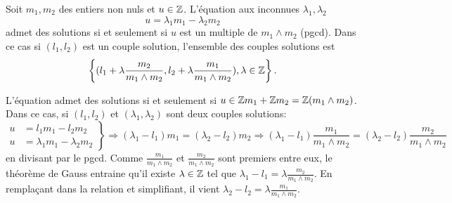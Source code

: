 \begin{propn}
  Soit $m_1, m_2$ des entiers non nuls et $u\in \mathbb{Z}$. L'équation aux inconnues $\lambda_1, \lambda_2$
  \begin{displaymath}
    u = \lambda_1 m_1 - \lambda_2 m_2
  \end{displaymath}
  admet des solutions si et seulement si $u$ est un multiple de $m_1 \wedge m_2$ (pgcd). Dans ce cas si $(l_1, l_2)$ est un couple solution, l'ensemble des couples solutions est
  \begin{displaymath}
    \left \lbrace (l_1 + \lambda \frac{m_2}{m_1 \wedge m_2},l_2 + \lambda \frac{m_1}{m_1 \wedge m_2}), \lambda \in \mathbb{Z} \right\rbrace .
  \end{displaymath}
\end{propn}
\begin{demo}
  L'équation admet des solutions si et seulement si $u \in \mathbb{Z} m_1 + \mathbb{Z} m_2 = \mathbb{Z} (m_1\wedge m_2)$. Dans ce cas, si $(l_1,l_2)$ et $(\lambda_1, \lambda_2)$ sont deux couples solutions:
  \begin{displaymath}
    \left.
    \begin{aligned}
      u &= l_1 m_1 - l_2 m_2 \\
      u &= \lambda_1 m_1 - \lambda_2 m_2
    \end{aligned}
    \right\rbrace \Rightarrow (\lambda_1 - l_1)m_1 = (\lambda_2 - l_2)m_2 \Rightarrow (\lambda_1 - l_1)\frac{m_1}{m_1 \wedge m_2} = (\lambda_2 - l_2)\frac{m_2}{m_1 \wedge m_2}
  \end{displaymath}
en divisant par le pgcd. Comme $\frac{m_1}{m_1 \wedge m_2}$ et $\frac{m_2}{m_1 \wedge m_2}$ sont premiers entre eux, le théorème de Gauss entraine qu'il existe $\lambda \in \mathbb{Z}$ tel que $\lambda_1 - l_1 = \lambda \frac{m_2}{m_1 \wedge m_2}$. En remplaçant dans la relation et simplifiant, il vient $\lambda_2 - l_2 = \lambda \frac{m_1}{m_1 \wedge m_2}$.
\end{demo}

